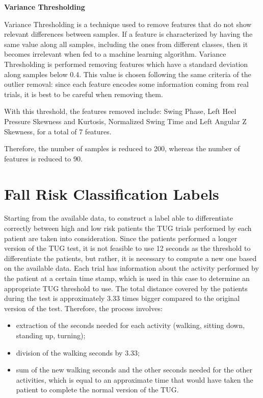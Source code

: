 \textbf{Variance Thresholding}

Variance Thresholding is a technique used to remove features that do not show relevant differences between samples. If a feature is characterized by having the same value along all samples, including the ones from different classes, then it becomes irrelevant when fed to a machine learning algorithm. 
Variance Thresholding is performed removing features which have a standard deviation along samples below 0.4. This value is chosen following the same criteria of the outlier removal: since each feature encodes some information coming from real trials, it is best to be careful when removing them.

With this threshold, the features removed include: Swing Phase, Left Heel Pressure Skewness and Kurtosis, Normalized Swing Time and Left Angular Z Skewness, for a total of 7 features.

Therefore, the number of samples is reduced to 200, whereas the number of features is reduced to 90.

\section{Fall Risk Classification Labels}

Starting from the available data, to construct a label able to differentiate correctly between high and low risk patients the TUG trials performed by each patient are taken into consideration. 
Since the patients performed a longer version of the TUG test, it is not feasible to use 12 seconds as the threshold to differentiate the patients, but rather, it is necessary to compute a new one based on the available data. 
Each trial has information about the activity performed by the patient at a certain time stamp, which is used in this case to determine an appropriate TUG threshold to use. 
The total distance covered by the patients during the test is approximately 3.33 times bigger compared to the original version of the test. 
Therefore, the process involves:

\begin{itemize}
    \item extraction of the seconds needed for each activity (walking, sitting down, standing up, turning);
    \item division of the walking seconds by 3.33;
    \item sum of the new walking seconds and the other seconds needed for the other activities, which is equal to an approximate time that would have taken the patient to complete the normal version of the TUG.
\end{itemize}

